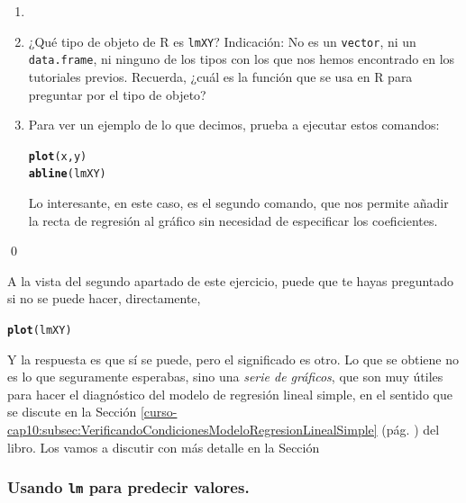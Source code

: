\documentclass[10pt,a4paper]{article}\usepackage[]{graphicx}\usepackage[]{color}
\makeatletter
\newcommand{\hlstd}[1]{\textcolor[rgb]{0.345,0.345,0.345}{#1}}%
\newcommand{\hlkwd}[1]{\textcolor[rgb]{0.737,0.353,0.396}{\textbf{#1}}}%
\newenvironment{kframe}{%
 \def\at@end@of@kframe{}%
 \ifinner\ifhmode%
  \def\at@end@of@kframe{\end{minipage}}%
  \begin{minipage}{\columnwidth}%
 \fi\fi%
 \def\FrameCommand##1{\hskip\@totalleftmargin \hskip-\fboxsep
 \colorbox{shadecolor}{##1}\hskip-\fboxsep
     \hskip-\linewidth \hskip-\@totalleftmargin \hskip\columnwidth}%
 \MakeFramed {\advance\hsize-\width
   \@totalleftmargin\z@ \linewidth\hsize
   \@setminipage}}%
 {\par\unskip\endMakeFramed%
 \at@end@of@kframe}
\newenvironment{knitrout}{}{} %
\newcounter {cont01}
\makeatother
\begin{document}
\begin{ejercicio}
\label{tut10:ejercicio06}
\begin{enumerate}
  \item[]
  \item ¿Qué tipo de objeto de R es {\tt lmXY}? Indicación: No es un {\tt vector}, ni un {\tt data.frame}, ni ninguno de los tipos con los que nos hemos encontrado en los tutoriales previos. Recuerda, ¿cuál es la función que se usa en R para preguntar por el tipo de objeto?

  \item Para ver un ejemplo de lo que decimos, prueba a ejecutar estos comandos:
\begin{knitrout}
\color{fgcolor}\begin{kframe}
\begin{alltt}
\hlkwd{plot}\hlstd{(x, y)}
\hlkwd{abline}\hlstd{(lmXY)}
\end{alltt}
\end{kframe}
\end{knitrout}
    Lo interesante, en este caso, es el segundo comando, que nos permite añadir la recta de regresión al gráfico sin necesidad de especificar los coeficientes.
\end{enumerate}
\qed
\end{ejercicio}

A la vista del segundo apartado de este ejercicio, puede que te hayas preguntado si no se puede hacer, directamente,
\begin{knitrout}
\color{fgcolor}\begin{kframe}
\begin{alltt}
\hlkwd{plot}\hlstd{(lmXY)}
\end{alltt}
\end{kframe}
\end{knitrout}
Y la respuesta es que sí se puede, pero el significado es otro. Lo que se obtiene no es lo que seguramente esperabas, sino una {\em serie de gráficos}, que son muy útiles para hacer el diagnóstico del modelo de regresión lineal simple, en el sentido que se discute en la Sección \ref{curso-cap10:subsec:VerificandoCondicionesModeloRegresionLinealSimple} (pág. \pageref{curso-cap10:subsec:VerificandoCondicionesModeloRegresionLinealSimple}) del libro. Los vamos a discutir con más detalle en la Sección

\subsubsection*{Usando {\tt lm} para predecir valores.}
\label{tut10:subsubsec:UsandoLmPredecirValores}
\end{document}
